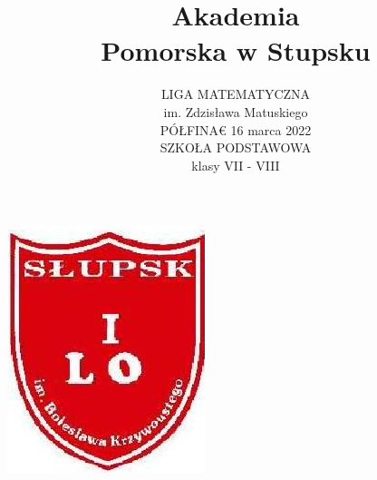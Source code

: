 \documentclass[10pt]{article}
\title{Akademia \\
 Pomorska w Stupsku }
\author{LIGA MATEMATYCZNA\\
im. Zdzisława Matuskiego\\
PÓŁFINA€ 16 marca 2022\\
SZKOŁA PODSTAWOWA\\
klasy VII - VIII}
\date{}
\begin{document}
\maketitle
\begin{center}
\includegraphics[max width=\textwidth]{2024_11_21_8e657902b94da6e597c6g-1(1)}
\end{center}
\end{document}
